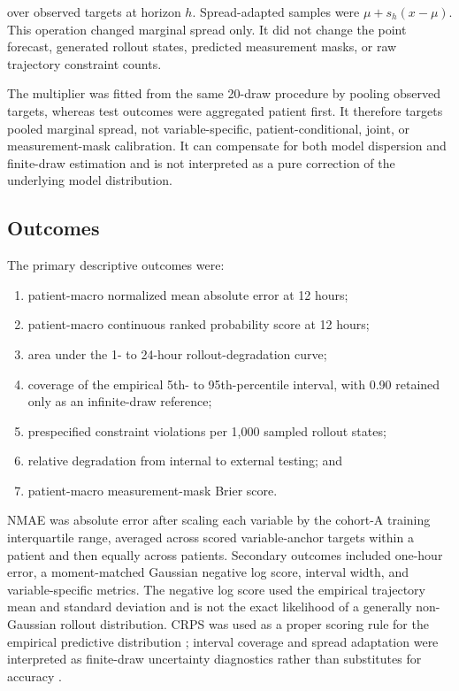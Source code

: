 \documentclass[conference]{IEEEtran}
\providecommand{\tightlist}{%
  \setlength{\itemsep}{0pt}\setlength{\parskip}{0pt}}
\begin{document}
over observed targets at horizon \(h\). Spread-adapted samples were
\(\mu+s_h(x-\mu)\). This operation changed marginal spread only. It did not
change the point forecast, generated rollout states, predicted measurement
masks, or raw trajectory constraint counts.

The multiplier was fitted from the same 20-draw procedure by pooling observed
targets, whereas test outcomes were aggregated patient first. It therefore
targets pooled marginal spread, not variable-specific, patient-conditional,
joint, or measurement-mask calibration. It can compensate for both model
dispersion and finite-draw estimation and is not interpreted as a pure
correction of the underlying model distribution.

\subsection{Outcomes}\label{outcomes}

The primary descriptive outcomes were:

\begin{enumerate}
\def\labelenumi{\arabic{enumi}.}
\tightlist
\item
  patient-macro normalized mean absolute error at 12 hours;
\item
  patient-macro continuous ranked probability score at 12 hours;
\item
  area under the 1- to 24-hour rollout-degradation curve;
\item
  coverage of the empirical 5th- to 95th-percentile interval, with 0.90
  retained only as an infinite-draw reference;
\item
  prespecified constraint violations per 1,000 sampled rollout states;
\item
  relative degradation from internal to external testing; and
\item
  patient-macro measurement-mask Brier score.
\end{enumerate}

NMAE was absolute error after scaling each variable by the cohort-A training
interquartile range, averaged across scored variable-anchor targets within a
patient and then equally across patients. Secondary outcomes included
one-hour error, a moment-matched Gaussian negative log score, interval width,
and variable-specific metrics. The negative log
score used the empirical trajectory mean and standard deviation and is not the
exact likelihood of a generally non-Gaussian rollout distribution. CRPS was
used as a proper scoring rule for the empirical predictive distribution \cite{b6};
interval coverage and spread adaptation were interpreted as finite-draw
uncertainty diagnostics rather than substitutes for accuracy \cite{b7,b8}.
\end{document}
